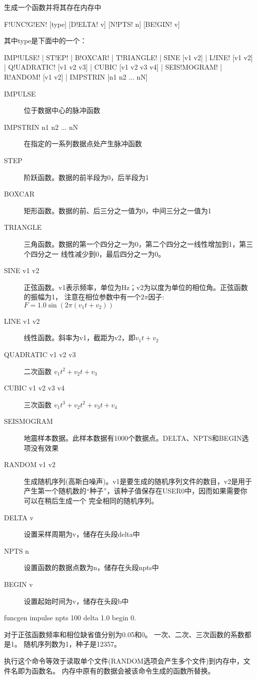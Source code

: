 \label{cmd:funcgen}

生成一个函数并将其存在内存中

\begin{SACSTX}
F!UNC!G!EN! [type] [D!ELTA! v] [N!PTS! n] [BE!GIN! v]
\end{SACSTX}
其中type是下面中的一个：
\begin{SACSTX}
IMP!ULSE! | ST!EP! | B!OXCAR! | T!RIANGLE! | SINE [v1 v2] | L!INE! [v1 v2] |
Q!UADRATIC! [v1 v2 v3] | CUBIC [v1 v2 v3 v4] | SEIS!MOGRAM! |
R!ANDOM! [v1 v2] | IMPSTRIN  [n1 n2 ... nN]
\end{SACSTX}

\begin{description}
\item [IMPULSE] 位于数据中心的脉冲函数
\item [IMPSTRIN n1 n2 ... nN] 在指定的一系列数据点处产生脉冲函数
\item [STEP] 阶跃函数。数据的前半段为0，后半段为1
\item [BOXCAR] 矩形函数。数据的前、后三分之一值为0，中间三分之一值为1
\item [TRIANGLE] 三角函数。数据的第一个四分之一为0，第二个四分之一线性增加到1，第三个四分之一
    线性减少到0，最后四分之一为0。
\item [SINE v1 v2] 正弦函数。v1表示频率，单位为Hz；v2为以度为单位的相位角。正弦函数的振幅为1，
    注意在相位参数中有一个$2\pi$因子: $ F = 1.0 \sin (2\pi (v_1t+v_2))$
\item [LINE v1 v2] 线性函数。斜率为v1，截距为v2，即$ v_1 t + v_2 $
\item [QUADRATIC v1 v2 v3] 二次函数 $v_1 t^{2} + v_2 t + v_3 $
\item [CUBIC v1 v2 v3 v4] 三次函数 $ v_1 t^{3} + v_2 t^2 + v_3t + v_4 $
\item [SEISMOGRAM] 地震样本数据。此样本数据有1000个数据点。DELTA、NPTS和BEGIN选项没有效果
\item [RANDOM v1 v2] 生成随机序列(高斯白噪声)。v1是要生成的随机序列文件的数目，v2是用于
    产生第一个随机数的``种子''，该种子值保存在USER0中，因而如果需要你可以在稍后生成一个
    完全相同的随机序列。
\item [DELTA v] 设置采样周期为v，储存在头段delta中
\item [NPTS n] 设置函数的数据点数为n，储存在头段npts中
\item [BEGIN v] 设置起始时间为v，储存在头段b中
\end{description}

\begin{SACDFT}
funcgen impulse npts 100 delta 1.0 begin 0.
\end{SACDFT}
对于正弦函数频率和相位缺省值分别为0.05和0。
一次、二次、三次函数的系数都是1。
随机序列数为1，种子是12357。

执行这个命令等效于读取单个文件(RANDOM选项会产生多个文件)到内存中，文件名即为函数名。
内存中原有的数据会被该命令生成的函数所替换。

